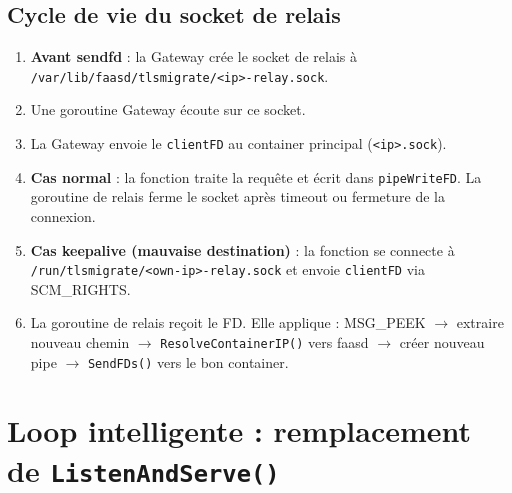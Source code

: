 \documentclass[11pt,a4paper]{article}
\begin{document}
\subsection{Cycle de vie du socket de relais}

\begin{enumerate}
  \item \textbf{Avant sendfd} : la Gateway crée le socket de relais à
    \texttt{/var/lib/faasd/tlsmigrate/<ip>-relay.sock}.
  \item Une goroutine Gateway écoute sur ce socket.
  \item La Gateway envoie le \texttt{clientFD} au container principal (\texttt{<ip>.sock}).
  \item \textbf{Cas normal} : la fonction traite la requête et écrit dans \texttt{pipeWriteFD}.
    La goroutine de relais ferme le socket après timeout ou fermeture de la connexion.
  \item \textbf{Cas keepalive (mauvaise destination)} : la fonction se connecte à
    \texttt{/run/tlsmigrate/<own-ip>-relay.sock} et envoie \texttt{clientFD} via SCM\_RIGHTS.
  \item La goroutine de relais reçoit le FD. Elle applique : MSG\_PEEK $\to$ extraire nouveau
    chemin $\to$ \texttt{ResolveContainerIP()} vers faasd $\to$ créer nouveau pipe $\to$
    \texttt{SendFDs()} vers le bon container.
\end{enumerate}


\section{Loop intelligente : remplacement de \texttt{ListenAndServe()}}
\end{document}
